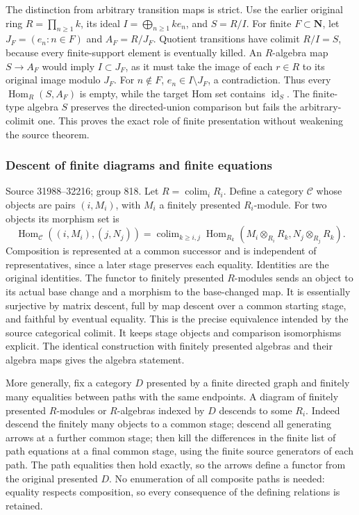 The distinction from arbitrary transition maps is strict. Use the earlier original ring \(R=\prod_{n\ge1}k\), its ideal \(I=\bigoplus_{n\ge1}ke_n\), and \(S=R/I\). For finite \(F\subset\mathbf N\), let \(J_F=(e_n:n\in F)\) and \(A_F=R/J_F\). Quotient transitions have colimit \(R/I=S\), because every finite-support element is eventually killed. An \(R\)-algebra map \(S\to A_F\) would imply \(I\subset J_F\), as it must take the image of each \(r\in R\) to its original image modulo \(J_F\). For \(n\notin F\), \(e_n\in I\setminus J_F\), a contradiction. Thus every \(\operatorname{Hom}_R(S,A_F)\) is empty, while the target Hom set contains \(\operatorname{id}_S\). The finite-type algebra \(S\) preserves the directed-union comparison but fails the arbitrary-colimit one. This proves the exact role of finite presentation without weakening the source theorem.

\subsubsection{Descent of finite diagrams and finite equations}\label{descent-of-finite-diagrams-and-finite-equations}

Source 31988--32216; group 818. Let \(R=\operatorname{colim}_iR_i\). Define a category \(\mathcal C\) whose objects are pairs \((i,M_i)\), with \(M_i\) a finitely presented \(R_i\)-module. For two objects its morphism set is \[
\operatorname{Hom}_{\mathcal C}((i,M_i),(j,N_j))
 =
\operatorname{colim}_{k\ge i,j}
\operatorname{Hom}_{R_k}(M_i\otimes_{R_i}R_k,N_j\otimes_{R_j}R_k).
\] Composition is represented at a common successor and is independent of representatives, since a later stage preserves each equality. Identities are the original identities. The functor to finitely presented \(R\)-modules sends an object to its actual base change and a morphism to the base-changed map. It is essentially surjective by matrix descent, full by map descent over a common starting stage, and faithful by eventual equality. This is the precise equivalence intended by the source categorical colimit. It keeps stage objects and comparison isomorphisms explicit. The identical construction with finitely presented algebras and their algebra maps gives the algebra statement.

More generally, fix a category \(D\) presented by a finite directed graph and finitely many equalities between paths with the same endpoints. A diagram of finitely presented \(R\)-modules or \(R\)-algebras indexed by \(D\) descends to some \(R_i\). Indeed descend the finitely many objects to a common stage; descend all generating arrows at a further common stage; then kill the differences in the finite list of path equations at a final common stage, using the finite source generators of each path. The path equalities then hold exactly, so the arrows define a functor from the original presented \(D\). No enumeration of all composite paths is needed: equality respects composition, so every consequence of the defining relations is retained.

